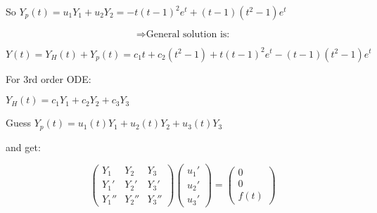 \documentclass{article}
\begin{document}
So $Y_p(t) = u_1Y_1 + u_2Y_2 = -t(t-1)^2e^t + (t-1)(t^2-1)e^t$

\[\Rightarrow \text{General solution is:}\]

\[Y(t) = Y_H(t) + Y_p(t) = c_1t + c_2(t^2-1) + t(t-1)^2e^t - (t-1)(t^2-1)e^t\]

For 3rd order ODE:

$Y_H(t) = c_1Y_1 + c_2Y_2 + c_3Y_3$

Guess $Y_p(t) = u_1(t)Y_1 + u_2(t)Y_2 + u_3(t)Y_3$

and get:

\[\begin{pmatrix}
Y_1 & Y_2 & Y_3 \\
Y_1' & Y_2' & Y_3' \\
Y_1'' & Y_2'' & Y_3''
\end{pmatrix} 
\begin{pmatrix}
u_1' \\ u_2' \\ u_3'
\end{pmatrix} = 
\begin{pmatrix}
0 \\ 0 \\ f(t)
\end{pmatrix}\]
\end{document}
